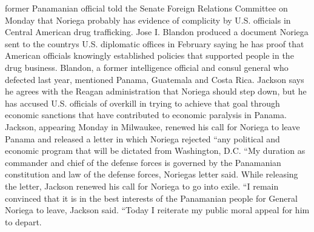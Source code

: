 \documentclass{article}
\begin{document}
former Panamanian official told the Senate Foreign Relations Committee on Monday that Noriega probably has evidence of complicity by U.S. officials in Central American drug trafficking. Jose I. Blandon \color[rgb]{0.8666666666666667,0.11372549019607843,0.5411764705882353}produced a \color[rgb]{0.9137254901960784,0.34509803921568627,0.1568627450980392}document Noriega sent to the countrys U.S. diplomatic offices in February saying he has proof that American officials knowingly established policies that supported people in the drug business. Blandon, a former intelligence official and consul general who defected last year, mentioned Panama, Guatemala and Costa Rica. Jackson says he agrees with the Reagan administration that Noriega should step down, but he has accused U.S. officials of overkill in trying to \color[rgb]{0.8666666666666667,0.11372549019607843,0.5411764705882353}achieve that goal through economic sanctions that have contributed to economic \color[rgb]{0.3333333333333333,0.6588235294117647,0.9686274509803922}paralysis in Panama. Jackson, appearing \color[rgb]{0.9137254901960784,0.34509803921568627,0.1568627450980392}Monday in Milwaukee, renewed his call for Noriega to leave Panama and released a letter in which Noriega rejected ``any political and \color[rgb]{0.3333333333333333,0.6588235294117647,0.9686274509803922}economic program that will be dictated from \color[rgb]{0.8666666666666667,0.11372549019607843,0.5411764705882353}Washington, D.C. ``My duration as commander and chief of the defense forces is \color[rgb]{0.9137254901960784,0.34509803921568627,0.1568627450980392}governed by the Panamanian constitution and law of the defense forces, Noriegas letter said. While releasing the letter, Jackson renewed his call for Noriega to go into \color[rgb]{0.8666666666666667,0.11372549019607843,0.5411764705882353}exile. ``I remain convinced that it is in the best interests of the \color[rgb]{0.9137254901960784,0.34509803921568627,0.1568627450980392}Panamanian people for General Noriega to leave, Jackson said. ``Today I reiterate my public moral appeal for him to depart. 
\end{document}
